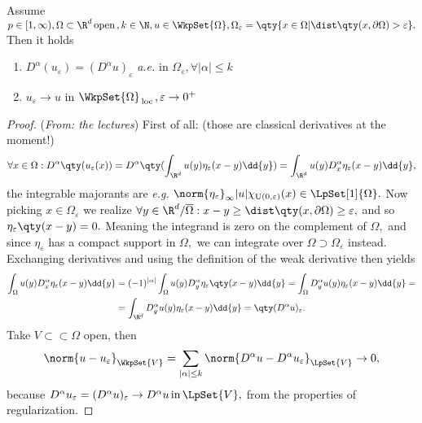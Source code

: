 \begin{lemma}
	Assume $p \in [1, \infty), \Omega \subset \R^d \, \text{open} \,, k \in \N, u \in \WkpSet{\Omega}, \Omega_{\varepsilon} = \qty{x \in \Omega | \dist\qty(x, \partial \Omega)>\varepsilon}.$ Then it holds
	\begin{enumerate}
		\item $D^\alpha(u_{\varepsilon}) = (D^\alpha u)_{\varepsilon}$ \textit{a.e.} in $\Omega_{\varepsilon}, \forall |\alpha| \leq k$
		\item $u_{\varepsilon}\to u$ in $\WkpSet{\Omega}_{\, \text{loc} \,}, \varepsilon \to 0^+$
	\end{enumerate}
\end{lemma}

\begin{proof}(\textit{From: the lectures})
	First of all: (those are classical derivatives at the moment!) \[
		\forall x \in \Omega: D^{\alpha}\qty(u_{\varepsilon}(x)) = D^{\alpha}\qty(\int_{\R^d}u(y)\eta_{\varepsilon}(x-y)\dd{y}) = \int_{\R^d}u(y)D_x^{\alpha}\eta_{\varepsilon}(x-y)\dd{y}, 
	\]
	the integrable majorants are \textit{e.g.} $\norm{\eta_{\varepsilon}}_{\infty}|u|\chi_{\text{U}(0,\varepsilon)}(x) \in \LpSet[1]{\Omega}.$ Now picking $x \in \Omega_{\varepsilon}$ we realize $\forall y \in \R^d / \overline{\Omega}: x-y \geq \dist\qty(x,\partial \Omega) \geq \varepsilon,$ and so $\eta_{\varepsilon}\qty(x-y) = 0.$ Meaning the integrand is zero on the complement of $\Omega,$ and since $\eta_{\varepsilon}$ has a compact support in $\Omega,$ we can integrate over $\Omega \supset \Omega_{\varepsilon}$ instead. Exchanging derivatives and using the definition of the weak derivative then yields
	\begin{align*}
		\int_{\Omega}u(y) D_x^{\alpha}\eta_{\varepsilon}(x-y)\dd{y} &=(-1)^{|\alpha|}\int_{\Omega}u(y)D_y^{\alpha}\eta_{\varepsilon}\qty(x-y)\dd{y} = \int_{\Omega}D^{\alpha}_y u(y) \eta_{\varepsilon}(x-y)\dd{y}= \\
		&=\int_{\R^d}D^{\alpha}_y u(y) \eta_{\varepsilon}(x-y)\dd{y} = \qty(D^{\alpha}u)_{\varepsilon}.
	\end{align*}
	Take $V \subset \subset \Omega$ open, then
	\[
		\norm{u - u_{\varepsilon}}_{\WkpSet{V}} = \sum_{|\alpha|\leq k}\norm{D^{\alpha}u - D^{\alpha}u_{\varepsilon}}_{\LpSet{V}} \to 0,
	\]
	because $D^{\alpha}u_{\varepsilon} = (D^{\alpha}u)_{\varepsilon} \to D^{\alpha}u \, \text{in} \, \LpSet{V},$ from the properties of regularization.
\end{proof}

